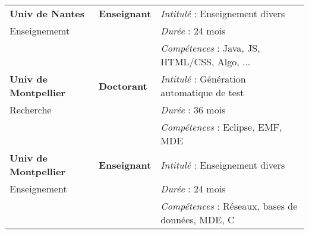 \begin{tabular}{l|l|l}
\hline
{\bf Univ de Nantes} & {\bf Enseignant} & {\it Intitulé} : Enseignement divers \\
Enseignememt &  & {\it Durée} : 24 mois \\
& & {\it Compétences} : Java, JS, HTML/CSS, Algo, ... \\

\hline
{\bf Univ de Montpellier} & {\bf Doctorant} & {\it Intitulé} : Génération automatique de test \\
Recherche &  & {\it Durée} : 36 mois \\
& & {\it Compétences} : Eclipse, EMF, MDE \\

\hline
{\bf Univ de Montpellier} & {\bf Enseignant} & {\it Intitulé} : Enseignement divers \\
Enseignement &  & {\it Durée} : 24 mois \\
& & {\it Compétences} : Réseaux, bases de données, MDE, C \\
\end{tabular}












